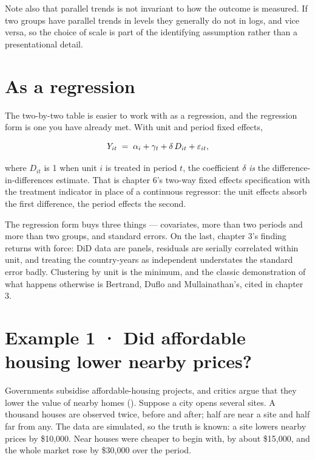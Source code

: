\documentclass[
  letterpaper,
  10pt,
  twoside,
  openright,
  numbers=noenddot,
  chapterprefix=true]{scrbook}
\begin{document}
Note also that parallel trends is not invariant to how the outcome is
measured. If two groups have parallel trends in levels they generally do
not in logs, and vice versa, so the choice of scale is part of the
identifying assumption rather than a presentational detail.

\section{As a regression}\label{as-a-regression}

The two-by-two table is easier to work with as a regression, and the
regression form is one you have already met. With unit and period fixed
effects,

\[
Y_{it} \thickspace=\thickspace \alpha_i + \gamma_t + \delta \thinspace D_{it} + \varepsilon_{it},
\]

where \(D_{it}\) is 1 when unit \(i\) is treated in period \(t\), the
coefficient \(\delta\) \emph{is} the difference-in-differences estimate.
That is chapter 6's two-way fixed effects specification with the
treatment indicator in place of a continuous regressor: the unit effects
absorb the first difference, the period effects the second.

The regression form buys three things --- covariates, more than two
periods and more than two groups, and standard errors. On the last,
chapter 3's finding returns with force: DiD data are panels, residuals
are serially correlated within unit, and treating the country-years as
independent understates the standard error badly. Clustering by unit is
the minimum, and the classic demonstration of what happens otherwise is
Bertrand, Duflo and Mullainathan's, cited in chapter 3.

\section{Example 1 · Did affordable housing lower nearby
prices?}\label{example-1-did-affordable-housing-lower-nearby-prices}

Governments subsidise affordable-housing projects, and critics argue
that they lower the value of nearby homes
(). Suppose a city opens
several sites. A thousand houses are observed twice, before and after;
half are near a site and half far from any. The data are simulated, so
the truth is known: a site lowers nearby prices by \$10,000. Near houses
were cheaper to begin with, by about \$15,000, and the whole market rose
by \$30,000 over the period.
\end{document}
